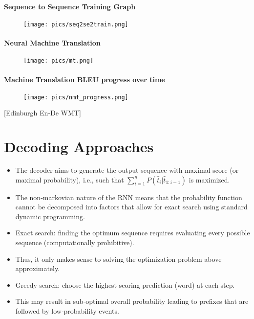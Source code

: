 \paragraph{Sequence to Sequence Training Graph}
         \begin{figure}[h]
        	\texttt{[image: pics/seq2se2train.png]}
        \end{figure}  
    




\paragraph{Neural Machine Translation}
         \begin{figure}[h]
        	\texttt{[image: pics/mt.png]}
        \end{figure}  

\paragraph{Machine Translation BLEU progress over time}
         \begin{figure}[h]
        	\texttt{[image: pics/nmt\_progress.png]}
        \end{figure}  
[Edinburgh En-De WMT]        


\section{Decoding Approaches}
\begin{itemize}
\item The decoder aims to generate  the output sequence with maximal score (or maximal probability), i.e., such that $\sum_{i=1}^{n}P(\hat{t}_i | \hat{t}_{1:i-1})$ is maximized. 
\item The non-markovian nature of the RNN means that the probability function cannot be decomposed into factors that allow for exact search using standard dynamic programming.
\item Exact search: finding the optimum sequence requires evaluating every possible sequence (computationally prohibitive).
\item Thus, it only makes sense to solving the optimization problem above approximately.
\item Greedy search: choose the highest scoring prediction (word) at each step.
\item This may result in sub-optimal overall probability leading to
prefixes that are followed by low-probability events.

\end{itemize}
        
